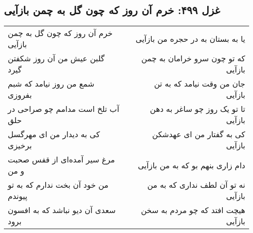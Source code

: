 \begin{center}
\section*{غزل ۴۹۹: خرم آن روز که چون گل به چمن بازآیی}
\label{sec:499}
\begin{longtable}{l p{0.5cm} r}
خرم آن روز که چون گل به چمن بازآیی
&&
یا به بستان به در حجره من بازآیی
\\
گلبن عیش من آن روز شکفتن گیرد
&&
که تو چون سرو خرامان به چمن بازآیی
\\
شمع من روز نیامد که شبم بفروزی
&&
جان من وقت نیامد که به تن بازآیی
\\
آب تلخ است مدامم چو صراحی در حلق
&&
تا تو یک روز چو ساغر به دهن بازآیی
\\
کی به دیدار من ای مهرگسل برخیزی
&&
کی به گفتار من ای عهدشکن بازآیی
\\
مرغ سیر آمده‌ای از قفس صحبت و من
&&
دام زاری بنهم بو که به من بازآیی
\\
من خود آن بخت ندارم که به تو پیوندم
&&
نه تو آن لطف نداری که به من بازآیی
\\
سعدی آن دیو نباشد که به افسون برود
&&
هیچت افتد که چو مردم به سخن بازآیی
\\
\end{longtable}
\end{center}
